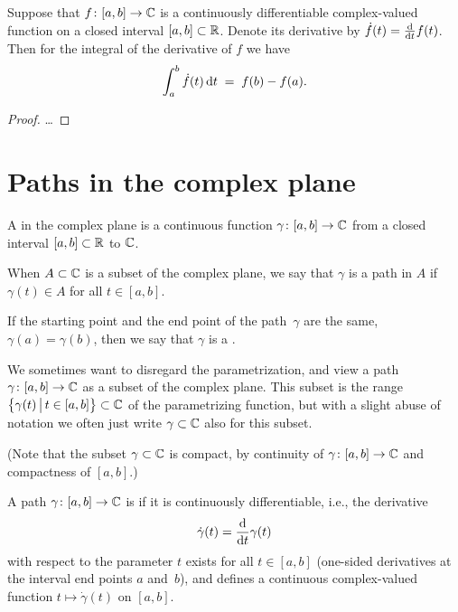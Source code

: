\begin{lemma}
  \label{lem:ftc_for_complex_valued_integrals}
  Suppose that $f \colon [a,b] \to \mathbb{C}$ is a continuously differentiable
  complex-valued function on a closed interval $[a,b] \subset \mathbb{R}$.
  Denote its derivative by $\dot{f}(t) = \frac{\mathrm{d}}{\mathrm{d} t} f(t)$.
  Then for the integral of the derivative of $f$ we have
  \begin{align*}
    \int_a^b \dot{f}(t) \, \mathrm{d} t \; = \; f(b) - f(a) .
  \end{align*}
\end{lemma}
\begin{proof}
  \ldots
\end{proof}



\section{Paths in the complex plane}

\begin{definition}
  \label{def:path}
  A  in the complex plane is a continuous function $\gamma \colon [a,b] \to \mathbb{C}$
  from a closed interval $[a,b] \subset \mathbb{R}$ to $\mathbb{C}$.

  When $A \subset \mathbb{C}$ is a subset of the complex plane, we say that $\gamma$ is a path in $A$
  if $\gamma(t) \in A$ for all $t \in [a,b]$.

  If the starting point and the end point of the path~$\gamma$ are the same,
  $\gamma(a) = \gamma(b)$, then we say that $\gamma$ is a .

  We sometimes want to disregard the parametrization, and view a path
  $\gamma \colon [a,b] \to \mathbb{C}$ as a subset of the complex plane.
  This subset is the range
  $\big\{ \gamma(t) \, \big| \, t \in [a,b] \big\} \subset \mathbb{C}$ of the
  parametrizing function, but with a slight abuse of notation we often just
  write $\gamma \subset \mathbb{C}$ also for this subset.

  (Note that the subset $\gamma \subset \mathbb{C}$ is compact, by continuity of
  $\gamma \colon [a,b] \to \mathbb{C}$ and compactness of $[a,b]$.)
\end{definition}

\begin{definition}
  \label{def:smooth_path}
  A path $\gamma \colon [a,b] \to \mathbb{C}$ is 
  if it is continuously differentiable, i.e., the derivative
  \begin{align*}
    \dot{\gamma}(t) = \frac{\mathrm{d}}{\mathrm{d} t} \gamma(t)
  \end{align*}
  with respect to the parameter $t$
  exists for all $t \in [a,b]$ (one-sided derivatives at the interval
  end points $a$ and~$b$),
  and defines a continuous complex-valued function $t \mapsto \dot{\gamma}(t)$
  on $[a,b]$.
\end{definition}

